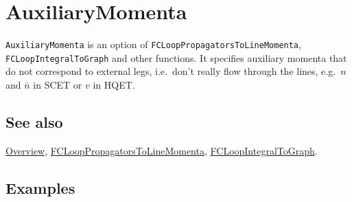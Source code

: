 \documentclass[../FeynCalcManual.tex]{subfiles}
\begin{document}
\hypertarget{auxiliarymomenta}{
\section{AuxiliaryMomenta}\label{auxiliarymomenta}}

\texttt{AuxiliaryMomenta} is an option of
\texttt{FCLoopPropagatorsToLineMomenta}, \texttt{FCLoopIntegralToGraph}
and other functions. It specifies auxiliary momenta that do not
correspond to external legs, i.e.~don't really flow through the lines,
e.g.~\(n\) and \(\bar{n}\) in SCET or \(v\) in HQET.

\subsection{See also}

\hyperlink{toc}{Overview},
\hyperlink{fclooppropagatorstolinemomenta}{FCLoopPropagatorsToLineMomenta},
\hyperlink{fcloopintegraltograph}{FCLoopIntegralToGraph}.

\subsection{Examples}
\end{document}
